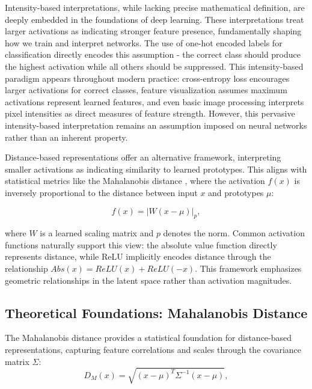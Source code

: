 Intensity-based interpretations, while lacking precise mathematical definition, are deeply embedded in the foundations of deep learning. These interpretations treat larger activations as indicating stronger feature presence, fundamentally shaping how we train and interpret networks. The use of one-hot encoded labels for classification directly encodes this assumption - the correct class should produce the highest activation while all others should be suppressed. This intensity-based paradigm appears throughout modern practice: cross-entropy loss encourages larger activations for correct classes, feature visualization \cite{erhan2009visualizing, olah2017feature} assumes maximum activations represent learned features, and even basic image processing interprets pixel intensities as direct measures of feature strength. However, this pervasive intensity-based interpretation remains an assumption imposed on neural networks rather than an inherent property.

Distance-based representations offer an alternative framework, interpreting smaller activations as indicating similarity to learned prototypes. This aligns with statistical metrics like the Mahalanobis distance \cite{mahalanobis1936generalized}, where the activation $f(x)$ is inversely proportional to the distance between input $x$ and prototypes $\mu$:

\begin{equation}
f(x) = |W(x - \mu)|_p,
\end{equation}

where $W$ is a learned scaling matrix and $p$ denotes the norm. Common activation functions naturally support this view: the absolute value function directly represents distance, while ReLU implicitly encodes distance through the relationship $Abs(x) = ReLU(x) + ReLU(-x)$. This framework emphasizes geometric relationships in the latent space rather than activation magnitudes.

\subsection{Theoretical Foundations: Mahalanobis Distance}

The Mahalanobis distance provides a statistical foundation for distance-based representations, capturing feature correlations and scales through the covariance matrix $\Sigma$:
\begin{equation}
    D_M(x) = \sqrt{(x - \mu)^T \Sigma^{-1} (x - \mu)},
\end{equation}

